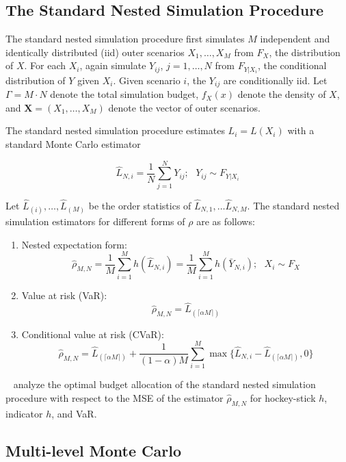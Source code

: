 \subsection{The Standard Nested Simulation Procedure}

The standard nested simulation procedure first simulates $M$ independent and identically distributed (iid) outer scenarios $X_1, \dots, X_M$ from $F_X$, the distribution of $X$.
For each $X_i$, again simulate $Y_{ij}$, $j = 1, \dots, N$ from $F_{Y|X_i}$, the conditional distribution of $Y$ given $X_i$. Given scenario $i$, the $Y_{ij}$ are conditionally iid. Let $\Gamma = M \cdot N$ denote the total simulation budget, $f_X(x)$ denote the density of $X$, and $\mathbf{X} = (X_1, \dots, X_M)$ denote the vector of outer scenarios.

The standard nested simulation procedure estimates $L_i = L(X_i)$ with a standard Monte Carlo estimator 

$$\hat{L}_{N, i} = \frac{1}{N} \sum_{j=1}^N Y_{ij}; ~~~ Y_{ij} \sim F_{Y|X_i} $$

Let $\hat{L}_{(i)}, \dots, \hat{L}_{(M)}$ be the order statistics of $\hat{L}_{N, 1}, \dots \hat{L}_{N, M}$. 
The standard nested simulation estimators for different forms of $\rho$ are as follows:

\begin{enumerate}
    \item   Nested expectation form:
            $$\hat{\rho}_{M, N} = \frac{1}{M} \sum_{i=1}^M h(\hat{L}_{N, i}) = \frac{1}{M} \sum_{i=1}^M h(\bar{Y}_{N, i}); ~~~ X_i \sim F_X$$
    \item   Value at risk (VaR):
            $$\hat{\rho}_{M, N} = \hat{L}_{(\lceil \alpha M \rceil)}$$
    \item   Conditional value at risk (CVaR):
            $$\hat{\rho}_{M, N} = \hat{L}_{(\lceil \alpha M \rceil)} + \frac{1}{(1-\alpha) M} \sum_{i=1}^M \max \{\hat{L}_{N, i} - \hat{L}_{(\lceil \alpha M \rceil)}, 0 \}$$
\end{enumerate}

~\cite{gordy2010nested} analyze the optimal budget allocation of the standard nested simulation procedure with respect to the MSE of the estimator $\hat{\rho}_{M, N}$ for hockey-stick $h$, indicator $h$, and VaR.


\subsection{Multi-level Monte Carlo}


